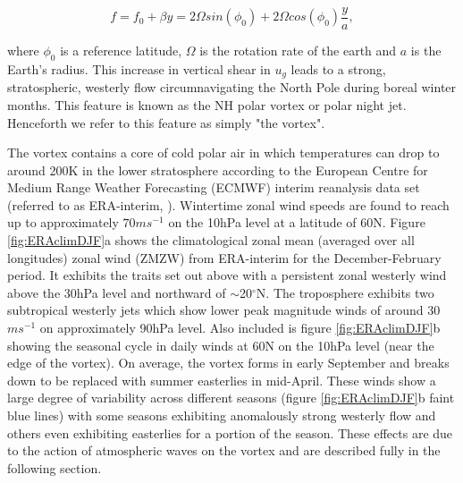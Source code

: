 \begin{equation} \label{eq:beta_plane_approx}
f = f_0 + \beta y = 2 \Omega sin(\phi_0) + 2 \Omega cos(\phi_0)\frac{ y}{a},
\end{equation}

\noindent where $\phi_0$ is a reference latitude, $\Omega$ is the rotation rate of the earth and $a$ is the Earth's radius. This increase in vertical shear in $u_g$ leads to a strong, stratospheric, westerly flow circumnavigating the North Pole during boreal winter months. This feature is known as the NH polar vortex or polar night jet. Henceforth we refer to this feature as simply "the vortex".

The vortex contains a core of cold polar air in which temperatures can drop to around 200K in the lower stratosphere according to the European Centre for Medium Range Weather Forecasting (ECMWF) interim reanalysis data set (referred to as ERA-interim, \cite{Uppala2005}). Wintertime zonal wind speeds are found to reach up to approximately $70ms^{-1}$ on the 10hPa level at a latitude of 60N. Figure \ref{fig:ERAclimDJF}a shows the climatological zonal mean (averaged over all longitudes) zonal wind (ZMZW) from ERA-interim for the December-February period. It exhibits the traits set out above with a persistent zonal westerly wind above the 30hPa level and northward of $\sim$20$^\circ$N. The troposphere exhibits two subtropical westerly jets which show lower peak magnitude winds of around 30$ms^{-1}$ on approximately 90hPa level. Also included is figure \ref{fig:ERAclimDJF}b showing the seasonal cycle in daily winds at 60N on the 10hPa level (near the edge of the vortex). On average, the vortex forms in early September and breaks down to be replaced with summer easterlies in mid-April. These winds show a large degree of variability across different seasons (figure \ref{fig:ERAclimDJF}b faint blue lines) with some seasons exhibiting anomalously strong westerly flow and others even exhibiting easterlies for a portion of the season. These effects are due to the action of atmospheric waves on the vortex and are described fully in the following section. 

